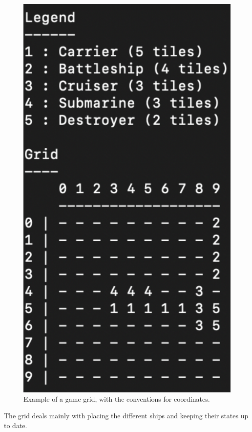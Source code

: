 \documentclass[a4paper, 12pt]{article}
\begin{document}
	\begin{figure}[!ht]
		\centering
		\includegraphics[scale=0.4]{resources/pdf/grid.pdf}
		\caption{Example of a game grid, with the conventions for coordinates.}
		\label{fig:grid}
	\end{figure}
	The grid deals mainly with placing the different ships and keeping their states up to date.
\end{document}
